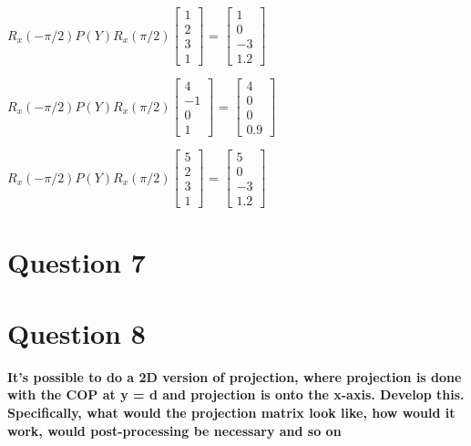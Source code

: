 \documentclass{article}
\begin{document}
\begin{center}
    \item $R_x(-\pi/2)P(Y)R_x(\pi/2)\begin{bmatrix}
1 \\2 \\3 \\1
\end{bmatrix}$ = $\begin{bmatrix}
1 \\0 \\-3 \\1.2
\end{bmatrix}$
    \item $R_x(-\pi/2)P(Y)R_x(\pi/2)\begin{bmatrix}
4 \\-1 \\0 \\1
\end{bmatrix}$ = $\begin{bmatrix}
4 \\0 \\0 \\0.9
\end{bmatrix}$
    \item $R_x(-\pi/2)P(Y)R_x(\pi/2)\begin{bmatrix}
5 \\2 \\3 \\1
\end{bmatrix}$ = $\begin{bmatrix}
5 \\0 \\-3 \\1.2
\end{bmatrix}$
\end{center}

\section{Question 7}



\section{Question 8}
\textbf{It's possible to do a 2D version of projection, where projection
is done with the COP at y = d and projection is onto the x-axis. Develop this.
Specifically, what would the projection matrix look like, how would it work,
would post-processing be necessary and so on}
\end{document}
